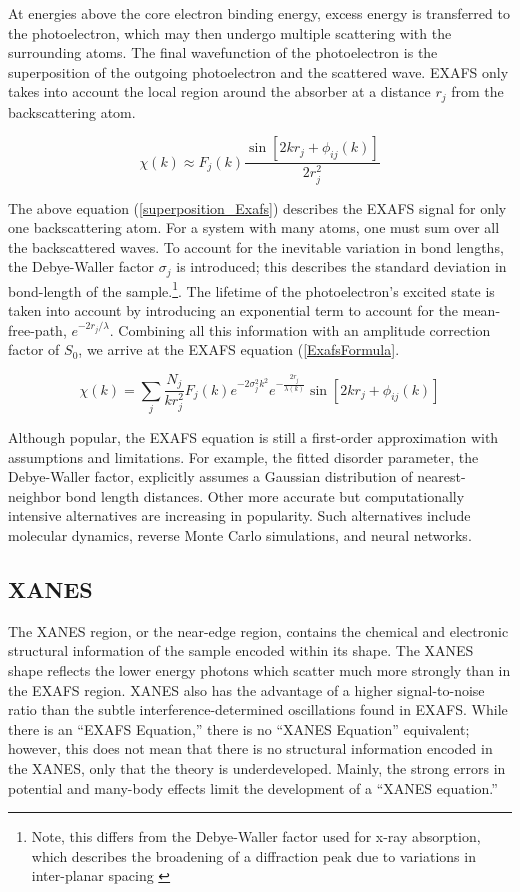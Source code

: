 At energies above the core electron binding energy, excess energy is transferred to the photoelectron, which may then undergo multiple scattering with the surrounding atoms. The final wavefunction of the photoelectron is the superposition of the outgoing photoelectron and the scattered wave. EXAFS only takes into account the local region around the absorber at a distance $ r_j $  from the backscattering atom.

\begin{equation}
    \label{superposition_Exafs}
    \chi(k) \approx F_j(k) \dfrac{\sin[2kr_j + \phi_{ij}(k)]}{2r_j^2}
\end{equation}

The above equation (\ref{superposition_Exafs}) describes the EXAFS signal for only one backscattering atom. For a system with many atoms, one must sum over all the backscattered waves. To account for the inevitable variation in bond lengths, the Debye-Waller factor $ \sigma_j $ is introduced; this describes the standard deviation in bond-length of the sample.\footnote{Note, this differs from the Debye-Waller factor used for x-ray absorption, which describes the broadening of a diffraction peak due to variations in inter-planar spacing \cite{DW-diffraction}}. The lifetime of the photoelectron's excited state is taken into account by introducing an exponential term to account for the mean-free-path, $ e^{-2r_j/\lambda} $. Combining all this information with an amplitude correction factor of $ S_0 $, we arrive at the EXAFS equation (\ref{ExafsFormula}. 

\begin{equation}
    \label{ExafsFormula}
    \chi(k) = \sum_j \frac{N_j}{kr_j^2}F_j(k)e^{-2\sigma_j^2k^2}e^{-\tfrac{2r_j}{\lambda(k)}}\sin[2kr_j + \phi_{ij}(k)]
\end{equation}

Although popular, the EXAFS equation is still a first-order approximation with assumptions and limitations. For example, the fitted disorder parameter, the Debye-Waller factor, explicitly assumes a Gaussian distribution of nearest-neighbor bond length distances. Other more accurate but computationally intensive alternatives are increasing in popularity. Such alternatives include molecular dynamics, reverse Monte Carlo simulations, and neural networks.

\subsection{XANES}
The XANES region, or the near-edge region, contains the chemical and electronic structural information of the sample encoded within its shape. The XANES shape reflects the lower energy photons which scatter much more strongly than in the EXAFS region. XANES also has the advantage of a higher signal-to-noise ratio than the subtle interference-determined oscillations found in EXAFS. While there is an ``EXAFS Equation,'' there is no ``XANES Equation'' equivalent; however, this does not mean that there is no structural information encoded in the XANES, only that the theory is underdeveloped. Mainly, the strong errors in potential and many-body effects limit the development of a ``XANES equation.'' 

